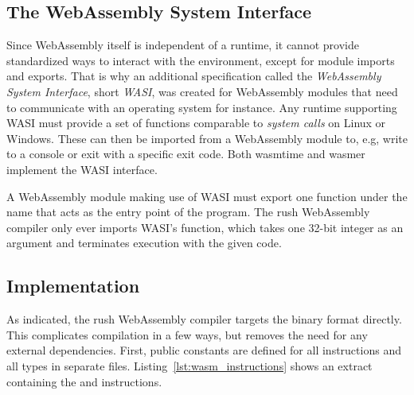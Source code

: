 \subsection{The WebAssembly System Interface}
Since WebAssembly itself is independent of a runtime, it cannot provide standardized ways to interact with the environment, except for module imports and exports.
That is why an additional specification called the \emph{WebAssembly System Interface}, short \emph{WASI}, was created for WebAssembly modules that need to communicate with an operating system for instance.
Any runtime supporting WASI must provide a set of functions comparable to \emph{system calls} on Linux or Windows.
These can then be imported from a WebAssembly module to, e.g, write to a console or exit with a specific exit code.
Both wasmtime and wasmer implement the WASI interface.

A WebAssembly module making use of WASI must export one function under the name  that acts as the entry point of the program.
The rush WebAssembly compiler only ever imports WASI's  function, which takes one 32-bit integer as an argument and terminates execution with the given code.

\subsection{Implementation}


As indicated, the rush WebAssembly compiler targets the binary format directly.
This complicates compilation in a few ways, but removes the need for any external dependencies.
First, public constants are defined for all instructions and all types in separate files.
Listing~\ref{lst:wasm_instructions} shows an extract containing the  and  instructions.

